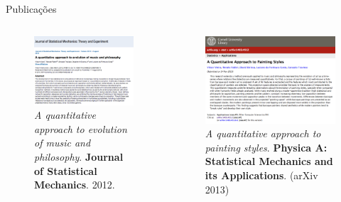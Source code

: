 \documentclass{beamer}
\begin{document}
\begin{frame}{Publicações}

  \begin{columns}

   \begin{column}{.49\textwidth}
\begin{figure}[h!]
\begin{center}
\includegraphics[width=\columnwidth]{figs/pub1} 
      \caption{\textit{A quantitative approach to evolution of music and philosophy}. \textbf{Journal of Statistical Mechanics}. 2012.}
\end{center}
\end{figure}
\end{column}

\begin{column}{.49\textwidth}
\begin{figure}[h!]
\begin{center}
\includegraphics[width=\columnwidth]{figs/physicaa1} 
      \caption{\textit{A quantitative approach to painting styles}. \textbf{Physica A: Statistical Mechanics and its Applications}. (arXiv 2013)}
\end{center}
\end{figure}
\end{column}

\end{columns}

\end{frame}
\end{document}
